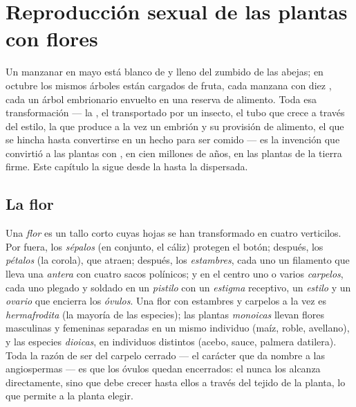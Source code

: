 \chapter{Reproducción sexual de las plantas con flores}\label{ch:b2:angiosperm-reproduction}

Un manzanar en mayo está blanco de  y lleno del zumbido de las
abejas; en octubre los mismos árboles están cargados de fruta, cada
manzana con diez , cada  un árbol embrionario envuelto en
una reserva de alimento. Toda esa transformación --- la , el 
transportado por un insecto, el tubo que crece a través del estilo, la
 que produce a la vez un embrión y su provisión de
alimento, el  que se hincha hasta convertirse en un  hecho
para ser comido --- es la invención que convirtió a las plantas con
, en cien millones de años, en las plantas  de la
tierra firme. Este capítulo la sigue desde la  hasta la 
dispersada.

\section{La flor}

\begin{definition}\label{def:b2:angiosperm-reproduction:flower}
Una \emph{flor} es un tallo corto cuyas hojas se han transformado en
cuatro verticilos. Por fuera, los \emph{sépalos} (en conjunto, el cáliz)
protegen el botón; después, los \emph{pétalos} (la corola), que atraen;
después, los \emph{estambres}, cada uno un filamento que lleva una
\emph{antera} con cuatro sacos polínicos; y en el centro uno o varios
\emph{carpelos}, cada uno plegado y soldado en un \emph{pistilo} con un
\emph{estigma} receptivo, un \emph{estilo} y un \emph{ovario} que
encierra los \emph{óvulos}. Una flor con estambres y carpelos a la vez es
\emph{hermafrodita} (la mayoría de las especies); las plantas
\emph{monoicas} llevan flores masculinas y femeninas separadas en un
mismo individuo (maíz, roble, avellano), y las especies \emph{dioicas},
en individuos distintos (acebo, sauce, palmera datilera). Toda la razón
de ser del carpelo cerrado --- el carácter que da nombre a las
angiospermas --- es que los óvulos quedan encerrados: el  nunca los
alcanza directamente, sino que debe crecer hasta ellos a través del
tejido de la planta, lo que permite a la planta elegir.
\end{definition}

